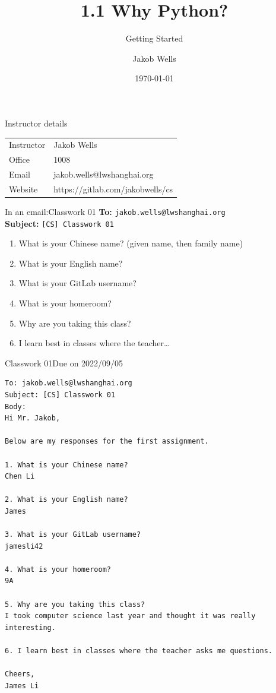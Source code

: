 \documentclass[aspectratio=169]{beamer}
\title{1.1 Why Python?}
\subtitle{Getting Started}
\author{Jakob Wells}
\begin{document}
\date{\today}


\begin{frame}
    \titlepage{}
\end{frame}

\begin{frame}{Instructor details}
    \begin{table}
    \centering
        \begin{tabular}{ll}
            Instructor & Jakob Wells                      \\
            Office     & 1008                             \\
            Email      & jakob.wells@lwshanghai.org       \\
            Website    & https://gitlab.com/jakobwells/cs \\
        \end{tabular}
    \end{table}
\end{frame}


\begin{frame}{In an email:}{Classwork 01}
    \textbf{To:} \texttt{jakob.wells@lwshanghai.org} \\
    \vspace{5pt}
    \textbf{Subject:} \texttt{[CS] Classwork 01} \\
    \vspace{10pt}
    \begin{enumerate}[label={\arabic*.}]
        \item What is your Chinese name? (given name, then family name)
        \item What is your English name?
        \item What is your GitLab username?
        \item What is your homeroom?
        \item Why are you taking this class?
        \item I learn best in classes where the teacher\ldots
    \end{enumerate}
\end{frame}


\begin{frame}[fragile]{Classwork 01}{Due on 2022/09/05}
    \begin{Verbatim}[fontsize=\tiny]
To: jakob.wells@lwshanghai.org
Subject: [CS] Classwork 01
Body:
Hi Mr. Jakob,

Below are my responses for the first assignment.

1. What is your Chinese name?
Chen Li

2. What is your English name?
James

3. What is your GitLab username?
jamesli42

4. What is your homeroom?
9A

5. Why are you taking this class?
I took computer science last year and thought it was really interesting.

6. I learn best in classes where the teacher asks me questions.

Cheers,
James Li
    \end{Verbatim}
\end{frame}
\end{document}
